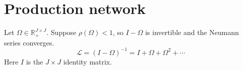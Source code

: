 \documentclass{article}
\begin{document}
\section{Production network}
Let $\Omega\in\mathbb{R}^{J\times J}_{+}$. Suppose $\rho(\Omega)<1$,
so $I-\Omega$ is invertible and the Neumann series converges.
\begin{equation}
  \mathcal L=(I-\Omega)^{-1}=I+\Omega+\Omega^2+\cdots
  \label{eq:leontief}
\end{equation}
Here $I$ is the $J\times J$ identity matrix.
\end{document}
